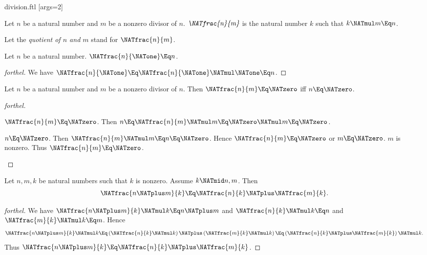 \documentclass{stex}
\begin{document}
\begin{smodule}{division.ftl}
[args=2]{}

\begin{definition}[forthel,id=ARITHMETIC_14_2313654268297915]
  Let $n$ be a natural number and $m$ be a nonzero divisor of $n$.
  $\emph{\NATfrac{n}{m}}$ is the natural number $k$ such that $k \NATmul m \Eq n$.

  Let the \emph{quotient of $n$ and $m$} stand for $\NATfrac{n}{m}$.
\end{definition}

\begin{proposition}[forthel,id=ARITHMETIC_14_0843793254698710]
  Let $n$ be a natural number.
  $\NATfrac{n}{\NATone} \Eq n$.
\end{proposition}
\begin{proof}[forthel]
  We have $\NATfrac{n}{\NATone}
    \Eq \NATfrac{n}{\NATone} \NATmul \NATone
    \Eq n$.
\end{proof}

\begin{proposition}[forthel,id=ARITHMETIC_14_1254235698632545]
  Let $n$ be a natural number and $m$ be a nonzero divisor of $n$.
  Then $\NATfrac{n}{m} \Eq \NATzero$ iff $n \Eq \NATzero$.
\end{proposition}
\begin{proof}[forthel]
  \begin{case}{$\NATfrac{n}{m} \Eq \NATzero$.}
    Then $n
      \Eq \NATfrac{n}{m} \NATmul m
      \Eq \NATzero \NATmul m
      \Eq \NATzero$.
  \end{case}

  \begin{case}{$n \Eq \NATzero$.}
    Then $\NATfrac{n}{m} \NATmul m
      \Eq n
      \Eq \NATzero$.
    Hence $\NATfrac{n}{m} \Eq \NATzero$ or $m \Eq \NATzero$.
    $m$ is nonzero.
    Thus $\NATfrac{n}{m} \Eq \NATzero$.
  \end{case}
\end{proof}

\begin{proposition}[forthel,id=ARITHMETIC_14_5137961454123875]
  Let $n, m, k$ be natural numbers such that $k$ is nonzero.
  Assume $k \NATmid n,m$.
  Then \[\NATfrac{n \NATplus m}{k} \Eq \NATfrac{n}{k} \NATplus \NATfrac{m}{k}.\]
\end{proposition}
\begin{proof}[forthel]
  We have $\NATfrac{n \NATplus m}{k} \NATmul k \Eq n \NATplus m$ and $\NATfrac{n}{k} \NATmul k \Eq n$ and $\NATfrac{m}{k} \NATmul k \Eq m$.
  Hence
  \[  \NATfrac{n \NATplus m}{k} \NATmul k
      \Eq \left( \NATfrac{n}{k} \NATmul k \right) \NATplus \left( \NATfrac{m}{k} \NATmul k \right)
      \Eq \left( \NATfrac{n}{k} \NATplus \NATfrac{m}{k} \right) \NATmul k. \]
  Thus $\NATfrac{n \NATplus m}{k} \Eq \NATfrac{n}{k} \NATplus \NATfrac{m}{k}$.
\end{proof}


\end{smodule}
\end{document}
